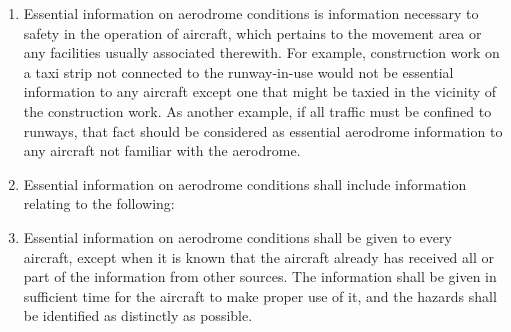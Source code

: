 \documentclass[../main.tex]{subfiles}
\begin{document}
    \begin{enumerate}[label=\arabic{section}.\arabic{subsection}.\arabic*]
        \item \label{7.5.1} Essential information on aerodrome conditions is information necessary to safety in the operation of aircraft, which pertains to the movement area or any facilities usually associated therewith. For example, construction work on a taxi strip not connected to the runway-in-use would not be essential information to any aircraft except one that might be taxied in the vicinity of the construction work. As another example, if all traffic must be confined to runways, that fact should be considered as essential aerodrome information to any aircraft not familiar with the aerodrome.
        \item \label{7.5.2} Essential information on aerodrome conditions shall include information relating to the following:



        \item Essential information on aerodrome conditions shall be given to every aircraft, except when it is known that the aircraft already has received all or part of the information from other sources. The information shall be given in sufficient time for the aircraft to make proper use of it, and the hazards shall be identified as distinctly as possible.


\end{enumerate}
\end{document}
